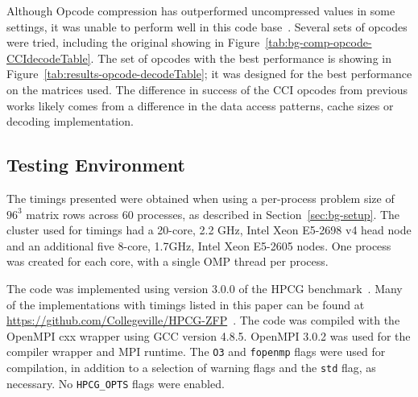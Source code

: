 Although Opcode compression has outperformed uncompressed values in some settings, it was unable to perform well in this code base~\cite{Lawlor:2013:compression}.
Several sets of opcodes were tried, including the original showing in Figure~\ref{tab:bg-comp-opcode-CCIdecodeTable}.
The set of opcodes with the best performance is showing in Figure~\ref{tab:results-opcode-decodeTable}; it was designed for the best performance on the matrices used.
The difference in success of the CCI opcodes from previous works likely comes from a difference in the data access patterns, cache sizes or decoding implementation.



\subsection{Testing Environment}
The timings presented were obtained when using a per-process problem size of \(96^3\) matrix rows across 60 processes, as described in Section~\ref{sec:bg-setup}.
The cluster used for timings had a 20-core, 2.2 GHz, Intel Xeon E5-2698 v4 head node and an additional five 8-core, 1.7GHz, Intel Xeon E5-2605 nodes.
One process was created for each core, with a single OMP thread per process.

The code was implemented using version 3.0.0 of the HPCG benchmark~\cite{Dongarra:2015:HPCG}.
Many of the implementations with timings listed in this paper can be found at \url{https://github.com/Collegeville/HPCG-ZFP}~\cite{Lindquist:2018:projectGithub}.
The code was compiled with the OpenMPI cxx wrapper using GCC version 4.8.5.
OpenMPI 3.0.2 was used for the compiler wrapper and MPI runtime.
The \texttt{O3} and \texttt{fopenmp} flags were used for compilation, in addition to a selection of warning flags and the \texttt{std} flag, as necessary.
No \texttt{HPCG\_OPTS} flags were enabled.